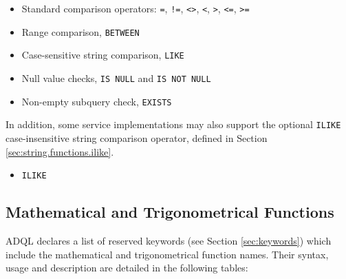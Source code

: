 \documentclass[11pt,a4paper]{ivoa}
\newcommand{\SectionRef}[1]{Section \ref{#1}\xspace}
\newcommand{\SectionSee}[1]{(see Section \ref{#1})\xspace}
\begin{document}
\begin{itemize}
    \item Standard comparison operators: \verb:=:, \verb:!=:, \verb:<>:, \verb:<:, \verb:>:, \verb:<=:, \verb:>=:
    \item Range comparison, \verb:BETWEEN:
    \item Case-sensitive string comparison, \verb:LIKE:
    \item Null value checks, \verb:IS NULL: and \verb:IS NOT NULL:
    \item Non-empty subquery check, \verb:EXISTS:
\end{itemize}

In addition, some service implementations may also support the optional \verb:ILIKE:
case-insensitive string comparison operator, defined in \SectionRef{sec:string.functions.ilike}.

\begin{itemize}
    \item \verb:ILIKE:
\end{itemize}

\clearpage
\subsection{Mathematical and Trigonometrical Functions}
\label{sec:math.functions}

ADQL declares a list of reserved keywords \SectionSee{sec:keywords} which include
the mathematical and trigonometrical function names. Their syntax,
usage and description are detailed in the following tables:
\end{document}

